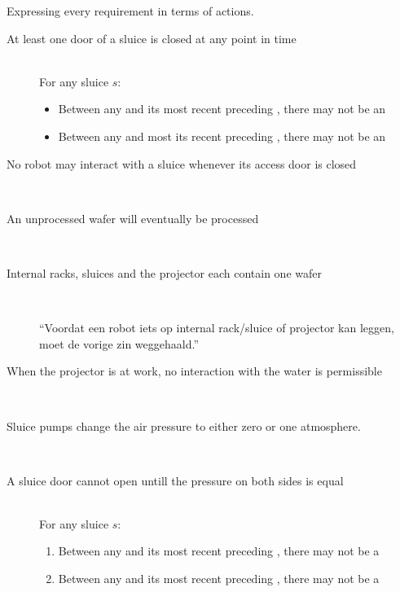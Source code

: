 
Expressing every requirement in terms of actions.

\begin{description}
 \item[At least one door of a sluice is closed at any point in time] \hfill \\
 For any sluice $s$:
 \begin{itemize}
  \item Between any  and its most recent preceding , there may not be an 
  \item Between any  and most its recent preceding , there may not be an 
 \end{itemize}

 \item[No robot may interact with a sluice whenever its access door is closed] \hfill \\
 
 \item[An unprocessed wafer will eventually be processed] \hfill \\
 
 \item[Internal racks, sluices and the projector each contain one wafer] \hfill \\
 
 ``Voordat een robot iets op internal rack/sluice of projector kan leggen, moet de vorige zin weggehaald.''
 
 \item[When the projector is at work, no interaction with the water is permissible] \hfill \\
 
 
 
 \item[Sluice pumps change the air pressure to either zero or one atmosphere.] \hfill \\
 
 \item[A sluice door cannot open untill the pressure on both sides is equal] \hfill \\
 For any sluice $s$:
 \begin{enumerate}
  \item Between any  and its most recent preceding , there may not be a 
  \item Between any  and its most recent preceding , there may not be a 
 \end{enumerate}


\end{description}
